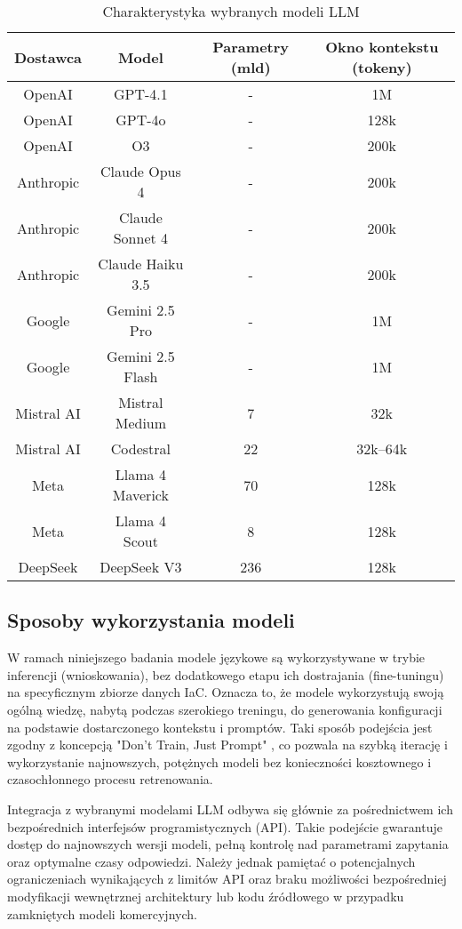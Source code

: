 \begin{table}[!h] \centering
\caption{Charakterystyka wybranych modeli LLM}
\label{tab:llm-characteristic}
\begin{tabular}{| c | c | c | c |} \hline
\textbf{Dostawca} & \textbf{Model} & \textbf{Parametry (mld)} & \textbf{Okno kontekstu (tokeny)} \\ \hline\hline
OpenAI & GPT-4.1 & - & 1M \\ \hline
OpenAI & GPT-4o & - & 128k \\ \hline
OpenAI & O3 & - & 200k \\ \hline
Anthropic & Claude Opus 4 & - & 200k \\ \hline
Anthropic & Claude Sonnet 4 & - & 200k \\ \hline
Anthropic & Claude Haiku 3.5 & - & 200k \\ \hline
Google & Gemini 2.5 Pro & - & 1M \\ \hline
Google & Gemini 2.5 Flash & - & 1M \\ \hline
Mistral AI & Mistral Medium & 7 & 32k \\ \hline
Mistral AI & Codestral & 22 & 32k–64k \\ \hline
Meta & Llama 4 Maverick & 70 & 128k \\ \hline
Meta & Llama 4 Scout & 8 & 128k \\ \hline
DeepSeek & DeepSeek V3 & 236 & 128k \\ \hline
\end{tabular}
\end{table}

\subsection{Sposoby wykorzystania modeli}

W ramach niniejszego badania modele językowe są wykorzystywane w trybie inferencji (wnioskowania), bez dodatkowego etapu ich dostrajania (fine-tuningu) na specyficznym zbiorze danych IaC. Oznacza to, że modele wykorzystują swoją ogólną wiedzę, nabytą podczas szerokiego treningu, do generowania konfiguracji na podstawie dostarczonego kontekstu i promptów. Taki sposób podejścia jest zgodny z koncepcją "Don't Train, Just Prompt" \cite{kratzke_dont_2024}, co pozwala na szybką iterację i wykorzystanie najnowszych, potężnych modeli bez konieczności kosztownego i czasochłonnego procesu retrenowania.

Integracja z wybranymi modelami LLM odbywa się głównie za pośrednictwem ich bezpośrednich interfejsów programistycznych (API). Takie podejście gwarantuje dostęp do najnowszych wersji modeli, pełną kontrolę nad parametrami zapytania oraz optymalne czasy odpowiedzi. Należy jednak pamiętać o potencjalnych ograniczeniach wynikających z limitów API oraz braku możliwości bezpośredniej modyfikacji wewnętrznej architektury lub kodu źródłowego w przypadku zamkniętych modeli komercyjnych.

